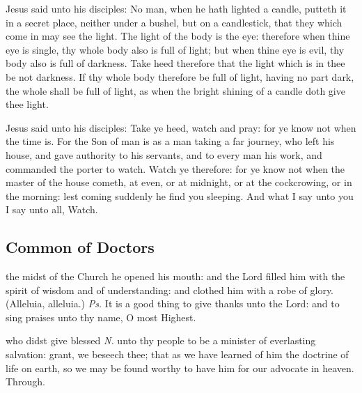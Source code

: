  Jesus said unto his disciples: No man, when he hath lighted a candle, putteth it in a secret place, neither under a bushel, but on a candlestick, that they which come in may see the light. The light of the body is the eye: therefore when thine eye is single, thy whole body also is full of light; but when thine eye is evil, thy body also is full of darkness. Take heed therefore that the light which is in thee be not darkness. If thy whole body therefore be full of light, having no part dark, the whole shall be full of light, as when the bright shining of a candle doth give thee light.

\label{Mark1333}
 Jesus said unto his disciples: Take ye heed, watch and pray: for ye know not when the time is. For the Son of man is as a man taking a far journey, who left his house, and gave authority to his servants, and to every man his work, and commanded the porter to watch. Watch ye therefore: for ye know not when the master of the house cometh, at even, or at midnight, or at the cockcrowing, or in the morning: lest coming suddenly he find you sleeping. And what I say unto you I say unto all, Watch.


\subsection{Common of Doctors}\label{CommonDoctors}

\introit
{} the midst of the Church he opened his mouth: and the Lord filled him with the spirit of wisdom and of understanding: and clothed him with a robe of glory. (Alleluia, alleluia.) \textit{Ps.} It is a good thing to give thanks unto the Lord: and to sing praises unto thy name, O most Highest.

\collect
{} who didst give blessed \textit{N.} unto thy people to be a minister of everlasting salvation: grant, we beseech thee; that as we have learned of him the doctrine of life on earth, so we may be found worthy to have him for our advocate in heaven. Through.

